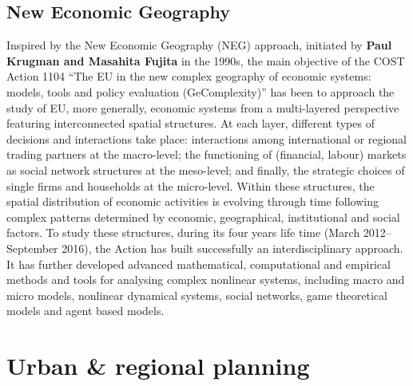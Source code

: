 \subsection{New Economic Geography}
Inspired by the New Economic Geography (NEG) approach, initiated by \textbf{Paul Krugman and Masahita Fujita} in the 1990s, the main objective of the COST Action 1104 “The EU in the new complex geography of economic systems: models, tools and policy evaluation (GeComplexity)” has been to approach the study of EU, more generally, economic systems from a multi-layered perspective featuring interconnected spatial structures. At each layer, different types of decisions and interactions take place: interactions among international or regional trading partners at the macro-level; the functioning of (financial, labour) markets as social network structures at the meso-level; and finally, the strategic choices of single firms and households at the micro-level. Within these structures, the spatial distribution of economic activities is evolving through time following complex patterns determined by economic, geographical, institutional and social factors. To study these structures, during its four years life time (March 2012–September 2016), the Action has built successfully an interdisciplinary approach. It has further developed advanced mathematical, computational and empirical methods and tools for analysing complex nonlinear systems, including macro and micro models, nonlinear dynamical systems, social networks, game theoretical models and agent based models.



\section{Urban \& regional planning}


\parencite{WongTai-Chee;YuenBelinda;Goldblum2008}


